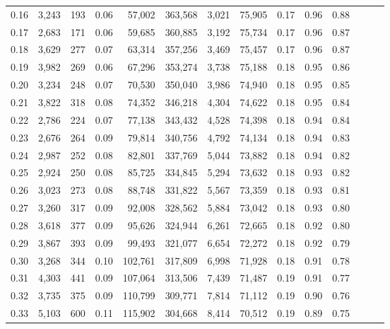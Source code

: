 \begin{tabular}{rrrrrrrrrrrrrr}
0.16 &   3,243 &    193 &  0.06 &   57,002 &  363,568 &   3,021 &  75,905 &  0.17 &  0.96 &      0.88 \\
0.17 &   2,683 &    171 &  0.06 &   59,685 &  360,885 &   3,192 &  75,734 &  0.17 &  0.96 &      0.87 \\
0.18 &   3,629 &    277 &  0.07 &   63,314 &  357,256 &   3,469 &  75,457 &  0.17 &  0.96 &      0.87 \\
0.19 &   3,982 &    269 &  0.06 &   67,296 &  353,274 &   3,738 &  75,188 &  0.18 &  0.95 &      0.86 \\
0.20 &   3,234 &    248 &  0.07 &   70,530 &  350,040 &   3,986 &  74,940 &  0.18 &  0.95 &      0.85 \\
0.21 &   3,822 &    318 &  0.08 &   74,352 &  346,218 &   4,304 &  74,622 &  0.18 &  0.95 &      0.84 \\
0.22 &   2,786 &    224 &  0.07 &   77,138 &  343,432 &   4,528 &  74,398 &  0.18 &  0.94 &      0.84 \\
0.23 &   2,676 &    264 &  0.09 &   79,814 &  340,756 &   4,792 &  74,134 &  0.18 &  0.94 &      0.83 \\
0.24 &   2,987 &    252 &  0.08 &   82,801 &  337,769 &   5,044 &  73,882 &  0.18 &  0.94 &      0.82 \\
0.25 &   2,924 &    250 &  0.08 &   85,725 &  334,845 &   5,294 &  73,632 &  0.18 &  0.93 &      0.82 \\
0.26 &   3,023 &    273 &  0.08 &   88,748 &  331,822 &   5,567 &  73,359 &  0.18 &  0.93 &      0.81 \\
0.27 &   3,260 &    317 &  0.09 &   92,008 &  328,562 &   5,884 &  73,042 &  0.18 &  0.93 &      0.80 \\
0.28 &   3,618 &    377 &  0.09 &   95,626 &  324,944 &   6,261 &  72,665 &  0.18 &  0.92 &      0.80 \\
0.29 &   3,867 &    393 &  0.09 &   99,493 &  321,077 &   6,654 &  72,272 &  0.18 &  0.92 &      0.79 \\
0.30 &   3,268 &    344 &  0.10 &  102,761 &  317,809 &   6,998 &  71,928 &  0.18 &  0.91 &      0.78 \\
0.31 &   4,303 &    441 &  0.09 &  107,064 &  313,506 &   7,439 &  71,487 &  0.19 &  0.91 &      0.77 \\
0.32 &   3,735 &    375 &  0.09 &  110,799 &  309,771 &   7,814 &  71,112 &  0.19 &  0.90 &      0.76 \\
0.33 &   5,103 &    600 &  0.11 &  115,902 &  304,668 &   8,414 &  70,512 &  0.19 &  0.89 &      0.75 \\

\end{tabular}
